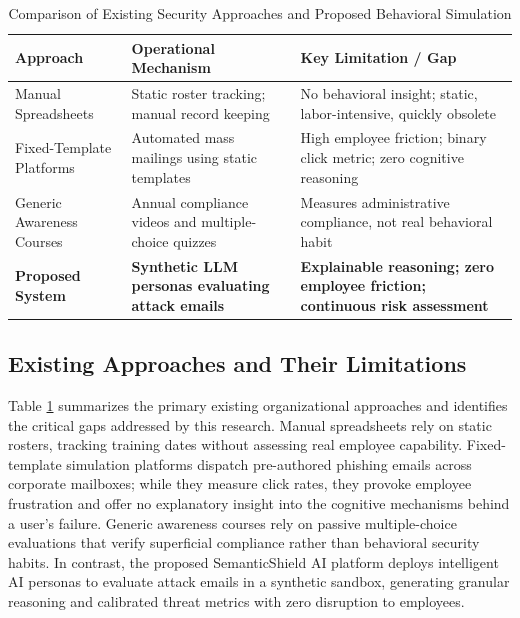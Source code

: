 \documentclass[conference,letterpaper]{IEEEtran}
\begin{document}
\begin{table}[t]
\caption{Comparison of Existing Security Approaches and Proposed Behavioral Simulation}
\label{tab:comparison}
\centering
\renewcommand{\arraystretch}{0.90}
\begin{tabularx}{\columnwidth}{lXp{1.9cm}}
\toprule
\textbf{Approach} & \textbf{Operational Mechanism} & \textbf{Key Limitation / Gap} \\
\midrule
Manual Spreadsheets & Static roster tracking; manual record keeping & No behavioral insight; static, labor-intensive, quickly obsolete \\
\addlinespace
Fixed-Template Platforms & Automated mass mailings using static templates & High employee friction; binary click metric; zero cognitive reasoning \\
\addlinespace
Generic Awareness Courses & Annual compliance videos and multiple-choice quizzes & Measures administrative compliance, not real behavioral habit \\
\addlinespace
\textbf{Proposed System} & \textbf{Synthetic LLM personas evaluating attack emails} & \textbf{Explainable reasoning; zero employee friction; continuous risk assessment} \\
\bottomrule
\end{tabularx}
\end{table}

\subsection{Existing Approaches and Their Limitations}
Table \ref{tab:comparison} summarizes the primary existing organizational approaches and identifies the critical gaps addressed by this research. Manual spreadsheets rely on static rosters, tracking training dates without assessing real employee capability. Fixed-template simulation platforms dispatch pre-authored phishing emails across corporate mailboxes; while they measure click rates, they provoke employee frustration and offer no explanatory insight into the cognitive mechanisms behind a user's failure. Generic awareness courses rely on passive multiple-choice evaluations that verify superficial compliance rather than behavioral security habits. In contrast, the proposed SemanticShield AI platform deploys intelligent AI personas to evaluate attack emails in a synthetic sandbox, generating granular reasoning and calibrated threat metrics with zero disruption to employees.
\end{document}
